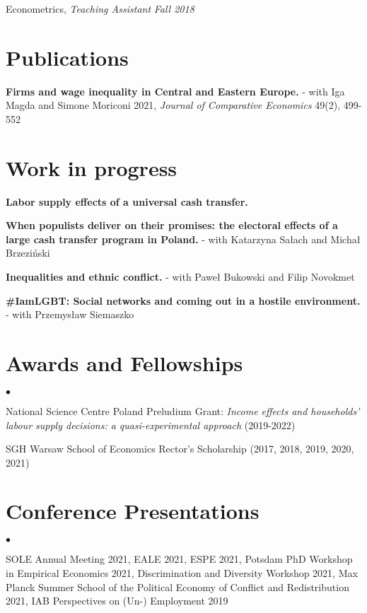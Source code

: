 \documentclass[margin,line]{res}
\newenvironment{list2}{
  \begin{list}{$\bullet$}{%
      \setlength{\itemsep}{0in}
      \setlength{\parsep}{0in} \setlength{\parskip}{0in}
      \setlength{\topsep}{0in} \setlength{\partopsep}{0in} 
      \setlength{\leftmargin}{0.2in}}}{\end{list}}
\begin{document}
\begin{resume}
\vspace{-.3cm}
Econometrics, \textit{Teaching Assistant} \hfill \textit{Fall 2018}\\
\vspace*{.05in}  

\section{\sc Publications}
\textbf{Firms and wage inequality in Central and Eastern Europe.} - with Iga Magda and Simone Moriconi 2021, \textit{Journal of Comparative Economics} 49(2), 499-552
\vspace*{.05in}  
\section{\sc Work in progress}

\textbf{Labor supply effects of a universal cash transfer. }

\textbf{When populists deliver on their promises: the electoral effects of a large cash transfer program in Poland.} - with Katarzyna Sałach and Michał Brzeziński

\textbf{Inequalities and ethnic conflict.} - with Paweł Bukowski and Filip Novokmet

\textbf{\#IamLGBT: Social networks and coming out in a hostile environment.} - with Przemysław Siemaszko
\vspace*{.05in}  
\section{\sc Awards and Fellowships} 
\begin{list2}
\item National Science Centre Poland Preludium Grant: \textit{Income effects and households' labour supply decisions: a quasi-experimental approach} (2019-2022)
\item SGH Warsaw School of Economics Rector's Scholarship (2017, 2018, 2019, 2020, 2021)
\end{list2}
\vspace*{.05in} 
\section{\sc Conference Presentations} 
\begin{list2}
	\item SOLE Annual Meeting 2021, EALE 2021, ESPE 2021, Potsdam PhD Workshop in Empirical Economics 2021, Discrimination and Diversity Workshop 2021, Max Planck Summer School of the Political Economy of Conflict and Redistribution 2021, IAB Perspectives on (Un-) Employment 2019 
\end{list2}
\vspace*{.05in} 

\end{resume}
\end{document}
